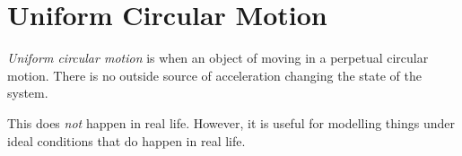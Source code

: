\section{Uniform Circular Motion} \label{sec:Uniform Circular Motion}
\begin{definition} \label{def:Uniform Circular Motion}
  \emph{Uniform circular motion} is when an object of moving in a perpetual circular motion.
  There is no outside source of acceleration changing the state of the system.
  \begin{remark}
    This does \emph{not} happen in real life.
    However, it is useful for modelling things under ideal conditions that do happen in real life.
  \end{remark}
\end{definition}
